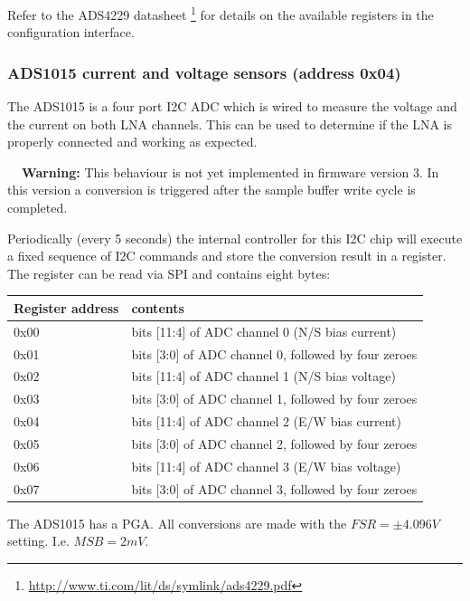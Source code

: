 \documentclass[a4paper,indent]{paper}
\newenvironment{warning}
{\par\begin{mdframed}[linewidth=2pt,linecolor=orange,backgroundcolor=orange!10]%
    \begin{list}{}{\leftmargin=0mm}\item[\bf\danger{}~~Warning: ]}
  {\end{list}\end{mdframed}\par}
\begin{document}
Refer to the ADS4229 datasheet \footnote{\url{http://www.ti.com/lit/ds/symlink/ads4229.pdf}} for details on the available registers in the configuration interface.


\subsubsection{ADS1015 current and voltage sensors (address 0x04)}
The ADS1015 is a four port \ac{I2C} \ac{ADC} which is wired to measure the voltage and the current on both \ac{LNA} channels. This can be used to determine if the \ac{LNA} is properly connected and working as expected.

\begin{warning}
    This behaviour is not yet implemented in firmware version 3. In this version a conversion is triggered after the sample buffer write cycle is completed. 
\end{warning}

Periodically (every 5 seconds) the internal controller for this \ac{I2C} chip will execute a fixed sequence of \ac{I2C} commands and store the conversion result in a register. The register can be read via \ac{SPI} and contains eight bytes:

\begin{center}
  \begin{tabular}{|l|l|}
    \hline
    Register address & contents \\
    \hline
    0x00 & bits [11:4] of \acs{ADC} channel 0 (N/S bias current)\\
    0x01 & bits [3:0]  of \acs{ADC} channel 0, followed by four zeroes\\
    0x02 & bits [11:4] of \acs{ADC} channel 1 (N/S bias voltage)\\
    0x03 & bits [3:0]  of \acs{ADC} channel 1, followed by four zeroes \\
    0x04 & bits [11:4] of \acs{ADC} channel 2 (E/W bias current)\\
    0x05 & bits [3:0]  of \acs{ADC} channel 2, followed by four zeroes \\
    0x06 & bits [11:4] of \acs{ADC} channel 3 (E/W bias voltage)\\
    0x07 & bits [3:0]  of \acs{ADC} channel 3, followed by four zeroes \\
    \hline
  \end{tabular}
\end{center}

The ADS1015 has a \ac{PGA}. All conversions are made with the $FSR=\pm4.096 V$ setting. I.e. $MSB = 2 mV$.
\end{document}
